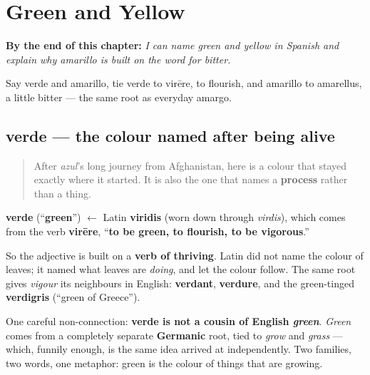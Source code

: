 
\chapter{Green and Yellow}
\label{ch:spanish-green-and-yellow}

\begin{chapteropening}
\textbf{By the end of this chapter:} \emph{I can name green and yellow in Spanish and explain why amarillo is built on the word for bitter.}

Say verde and amarillo, tie verde to virēre, to flourish, and amarillo to amarellus, a little bitter — the same root as everyday amargo.
\end{chapteropening}

\section[verde]{verde — the colour named after being alive}

\label{lesson:ES-C33-verde}



\begin{quote}
After \emph{azul}'s long journey from Afghanistan, here is a colour that stayed exactly where it started. It is also the one that names a \textbf{process} rather than a thing.
\end{quote}

\begin{cousinweb}
\textbf{verde} (\textquotedblleft{}\textbf{green}\textquotedblright{}) $\leftarrow$ Latin \textbf{viridis} (worn down through \emph{virdis}), which comes from the verb \textbf{virēre}, \textquotedblleft{}\textbf{to be green, to flourish, to be vigorous}.\textquotedblright{}

So the adjective is built on a \textbf{verb of thriving}. Latin did not name the colour of leaves; it named what leaves are \emph{doing}, and let the colour follow. The same root gives \emph{vigour} its neighbours in English: \textbf{verdant}, \textbf{verdure}, and the green-tinged \textbf{verdigris} (\textquotedblleft{}green of Greece\textquotedblright{}).

One careful non-connection: \textbf{verde is not a cousin of English \emph{green}}. \emph{Green} comes from a completely separate \textbf{Germanic} root, tied to \emph{grow} and \emph{grass} — which, funnily enough, is the same idea arrived at independently. Two families, two words, one metaphor: green is the colour of things that are growing.
\end{cousinweb}

